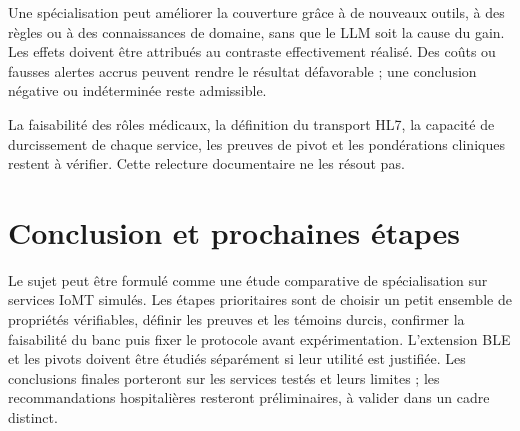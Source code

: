 \documentclass[11pt,a4paper]{article}
\begin{document}
Une spécialisation peut améliorer la couverture grâce à de nouveaux outils,
à des règles ou à des connaissances de domaine, sans que le LLM soit la cause du
gain. Les effets doivent être attribués au contraste effectivement réalisé.
Des coûts ou fausses alertes accrus peuvent rendre le résultat défavorable ;
une conclusion négative ou indéterminée reste admissible.

La faisabilité des rôles médicaux, la définition du transport HL7, la capacité
de durcissement de chaque service, les preuves de pivot et les pondérations
cliniques restent à vérifier. Cette relecture documentaire ne les résout pas.

\section{Conclusion et prochaines étapes}
Le sujet peut être formulé comme une étude comparative de spécialisation sur
services IoMT simulés. Les étapes prioritaires sont de choisir un petit ensemble
de propriétés vérifiables, définir les preuves et les témoins durcis, confirmer
la faisabilité du banc puis fixer le protocole avant expérimentation.
L'extension BLE et les pivots doivent être étudiés séparément si leur utilité
est justifiée. Les conclusions finales porteront sur les services testés et
leurs limites ; les recommandations hospitalières resteront préliminaires,
à valider dans un cadre distinct.
\end{document}
